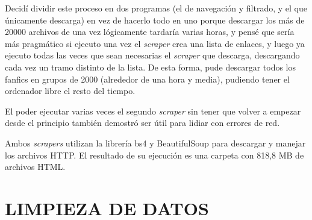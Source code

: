 \documentclass{pre-tfg}
\begin{document}
Decidí dividir este proceso en dos programas (el de navegación y filtrado, y el que únicamente descarga) en vez de hacerlo todo en uno porque descargar los más de 20000 archivos de una vez lógicamente tardaría varias horas, y pensé que sería más pragmático si ejecuto una vez el \textit{scraper} crea una lista de enlaces, y luego ya ejecuto todas las veces que sean necesarias el \textit{scraper} que descarga, descargando cada vez un tramo distinto de la lista. De esta forma, pude descargar todos los fanfics en grupos de 2000 (alrededor de una hora y media), pudiendo tener el ordenador libre el resto del tiempo.

El poder ejecutar varias veces el segundo \textit{scraper} sin tener que volver a empezar desde el principio también demostró ser útil para lidiar con errores de red.

Ambos \textit{scrapers} utilizan la librería bs4 y BeautifulSoup para descargar y manejar los archivos HTTP. El resultado de su ejecución es una carpeta con 818,8 MB de archivos HTML.

\section{LIMPIEZA DE DATOS}
\end{document}
